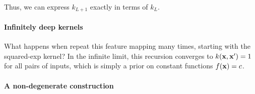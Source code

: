 \documentclass[twoside]{article}
\begin{document}
%
%
Thus, we can express $k_{L+1}$ exactly in terms of $k_L$.

\paragraph{Infinitely deep kernels}
What happens when repeat this feature mapping many times, starting with the squared-exp kernel?  In the infinite limit, this recursion converges to $k({\bf{x}},{\bf{x}}') = 1$ for all pairs of inputs, which is simply a prior on constant functions $f({\bf{x}}) = c$.

%

\paragraph{A non-degenerate construction}
\end{document}
